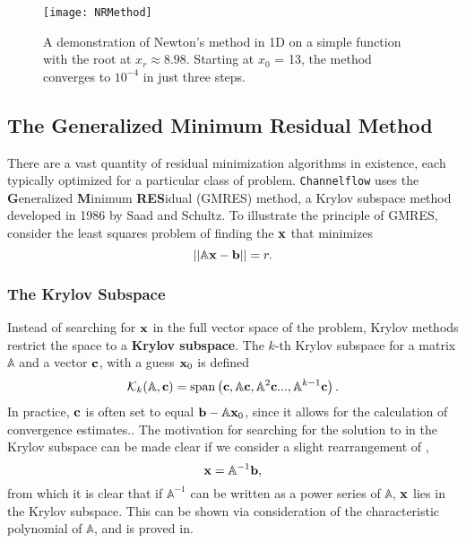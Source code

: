 \begin{figure}[h]
\texttt{[image: NRMethod]}
\caption{A demonstration of Newton's method in 1D on a simple function with the root at $x_r \approx 8.98$. Starting at $x_0$ = 13, the method converges to $10^{-4}$ in just three steps.}\label{fig:Newton}
\end{figure}  
\subsection{The Generalized Minimum Residual Method}

There are a vast quantity of residual minimization algorithms in existence, each typically optimized for a particular class of problem. {\tt Channelflow} uses the {\bf G}eneralized {\bf M}inimum {\bf RES}idual (GMRES) method, a Krylov subspace method developed in 1986 by Saad and Schultz. To illustrate the principle of GMRES, consider the least squares problem of finding the $\mathbf{x}$ that minimizes
\begin{equation}\label{eq:AXB}
||\mathbb{A}\mathbf{x} -\mathbf{b}|| = r.
\end{equation}

\subsubsection{The Krylov Subspace}
Instead of searching for $\mathbf{x}$ in the full vector space of the problem, Krylov methods restrict the space to a {\bf Krylov subspace}. The $k$-th Krylov subspace for a matrix $\mathbb{A}$ and a vector $\mathbf{c}$, with a guess $\mathbf{x}_0$ is defined
\begin{equation}\label{eq:krylov}
\mathcal{K}_k(\mathbb{A},\mathbf{c}) = \mathrm{span}\left ( \mathbf{c},\mathbb{A}\mathbf{c},\mathbb{A}^2\mathbf{c}...,\mathbb{A}^{k-1}\mathbf{c} \right ).
 \end{equation}
In practice, $\mathbf{c}$ is often set to equal $\mathbf{b} - \mathbb{A}\mathbf{x}_0$, since it allows for the calculation of convergence estimates.. The motivation for searching for the solution to  in the Krylov subspace can be made clear if we consider a slight rearrangement of ,
 \begin{equation}
 \mathbf{x} = \mathbb{A}^{-1}\mathbf{b},
 \end{equation}
 from which it is clear that if $\mathbb{A}^{-1}$ can be written as a power series of $\mathbb{A}$, $\mathbf{x}$ lies in the Krylov subspace. This can be shown via consideration of the characteristic polynomial of $\mathbb{A}$, and is proved in. 
 
